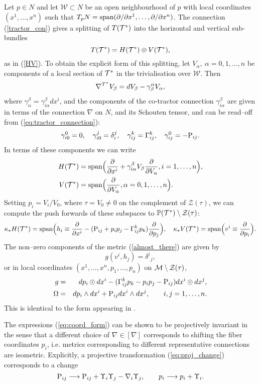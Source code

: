 Let $p\in N$ and let ${\mathcal W}\subset N$ be an open 
neighbourhood of $p$ with 
local coordinates $(x^1, \dots, x^n)$ such that
$T_pN=\mbox{span}(\partial/\partial x^1, \dots, \partial/\partial x^n)$. The connection 
(\ref{tractor_con}) gives a splitting of $T(\mathcal{T}^*)$ into the horizontal and
vertical sub-bundles
\[
T(\mathcal{T}^*)=H(\mathcal{T}^*)\oplus V(\mathcal{T}^*),
\]
as in (\ref{HV}).
To obtain the explicit form of this splitting, let $V_\alpha,\ \alpha=0, 1, \dots, n$ be components of a local section of $\mathcal{T}^*$ in the trivialisation over ${\mathcal{W}}$.
Then
\[
\nabla^{\mathcal{T}^*} V_\beta=d V_\beta-\gamma_{\beta}^{\alpha} V_\alpha,
\]
where $\gamma_{\alpha}^\beta= \gamma_{i\alpha}^\beta dx^i$, and the components
of the co-tractor connection 
$\gamma_{i\alpha}^\beta$  are given in terms of the connection
$\nabla$ on $N$, and its Schouten tensor, and 
can be read--off from (\ref{eq:tractor_connection}):
\[
\gamma_{i0}^0=0, \quad \gamma_{i0}^j=\delta_i^j,\quad
\gamma_{ij}^k=\Gamma_{ij}^k, \quad \gamma_{ij}^0=-\mathrm{P}_{ij}.
\]
In terms of these components we can write
\begin{align*}
H(\mathcal{T}^*)&=\mbox{span}
\Big( \frac{\partial}{\partial x^i}+ {\gamma_{i\alpha}^\beta} V_\beta
\frac{\partial}{\partial V_{\alpha}}, i=1, \dots, n \Big), \\
 V(\mathcal{T}^*)&=\mbox{span}\Big(\frac{\partial}{\partial V_{\alpha}}, \alpha=0, 1, 
\dots, n\Big).
\end{align*}
Setting $p_i=V_i/V_0$, where $\tau=V_0\neq 0$ %
on the complement of 
$\mathcal{Z}(\tau)$, 
  we can compute the push forwards
of these subspaces to $\mathbb{P}(\mathcal{T}^*)\setminus {\mathcal{Z}(\tau)}$:
\[
\kappa_* H(\mathcal{T}^*)=\mbox{span}\Big(h_i\equiv
\frac{\partial}{\partial x^i}-
(\mathrm{P}_{ij}+p_ip_j  -\Gamma_{ij}^kp_k)\frac{\partial}{\partial p_j}
\Big), \quad \kappa_* V(\mathcal{T}^*)=\mbox{span}\Big(v^i\equiv\frac{\partial}{\partial p_i}
\Big).
\]
The non--zero components of the  metric (\ref{almost_there}) are given by
\[
g(v^i, h_j)={\delta^i}_j,
\]
or in local coordinates $(x^1,\dots,x^n,p_1,\dots,p_n)$ on $\mathcal{M}\setminus {\mathcal{Z}(\tau)}$,
\begin{eqnarray}
g & = &  dp_{i}\odot dx^{i}-(\Gamma_{ij}^{k}p_{k}-p_{i}p_{j}-\mathrm{P}_{ij}) dx^{i}\odot dx^{j},\label{eq:coord_form}\\
\Omega & = &  dp_{i}\wedge dx^{i}+\mathrm{P}_{ij} dx^{i}\wedge dx^{j},\qquad i,j=1,\dots ,n.\nonumber 
\end{eqnarray}
This is identical to the form appearing in \cite{DM}.
\koniec

The expressions (\ref{eq:coord_form}) can be shown to be projectively invariant in the sense that a different choice of $\nabla\in[\nabla]$ corresponds to shifting the fiber coordinates $p_{i}$, i.e. metrics corresponding to different representative connections are isometric. Explicitly, a projective transformation (\ref{eq:proj_change}) corresponds to a change \begin{equation}
\mathrm{P}_{ij}\longrightarrow \mathrm{P}_{ij}+\Upsilon_{i}\Upsilon_{j}-\nabla_{i}\Upsilon_{j},\qquad p_{i}\longrightarrow p_{i}+\Upsilon_{i}.\label{eq:p_change}
\end{equation}

